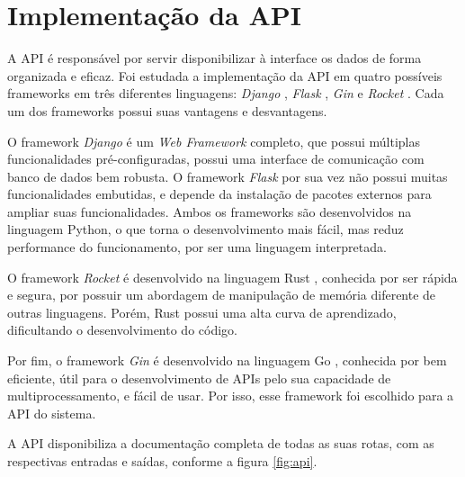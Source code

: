 \section{Implementação da API}
\label{sec:Implementação da API}

A API é responsável por servir disponibilizar à interface os dados de forma organizada e eficaz. Foi estudada a implementação da API em quatro possíveis frameworks em três diferentes linguagens:
\textit{Django} \cite{site-django}, \textit{Flask} \cite{site-flask}, \textit{Gin} \cite{site-gin} e \textit{Rocket} \cite{site-rocket}. Cada um dos frameworks possui suas vantagens e desvantagens.

O framework \textit{Django} é um \textit{Web Framework} completo, que possui múltiplas funcionalidades pré-configuradas, possui uma interface de comunicação com banco de dados bem robusta. O framework \textit{Flask} por sua vez não possui muitas funcionalidades embutidas, e depende da instalação de pacotes externos para ampliar suas funcionalidades. Ambos os frameworks são desenvolvidos na linguagem Python, o que torna o desenvolvimento mais fácil, mas reduz performance do funcionamento, por ser uma linguagem interpretada.

O framework \textit{Rocket} é desenvolvido na linguagem Rust \cite{site-rust}, conhecida por ser rápida e segura, por possuir um abordagem de manipulação de memória diferente de outras linguagens. Porém, Rust possui uma alta curva de aprendizado, dificultando o desenvolvimento do código.

Por fim, o framework \textit{Gin} é desenvolvido na linguagem Go \cite{site-go}, conhecida por bem eficiente, útil para o desenvolvimento de APIs pelo sua capacidade de multiprocessamento, e fácil de usar. Por isso, esse framework foi escolhido para a API do sistema.

A API disponibiliza a documentação completa de todas as suas rotas, com as respectivas entradas e saídas, conforme a figura \ref{fig:api}.

